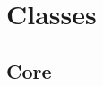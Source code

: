 \chapter{Classes}
\label{ch:class}


\newcommand{\clsDiagram}{\paragraph{\textbf{Class Diagram}}}
\newcommand{\clsdsp}{\paragraph{\textbf{Description:\\}}}
\newcommand{\clsdcl}{\paragraph{\textbf{Declaration:\\}}}
\newcommand{\clscon}{\paragraph{\textbf{Constructor:\\}}}
\newcommand{\clsfield}{\paragraph{\textbf{Fields:\\}}}
\newcommand{\clsmethod}{\paragraph{\textbf{Methods:\\}}}


\section{Core}

